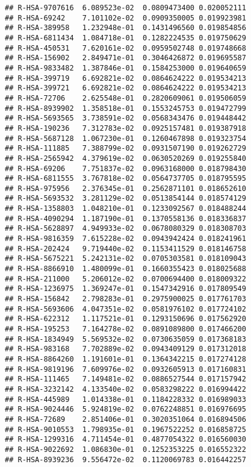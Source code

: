 \documentclass[
]{article}
\begin{document}
\begin{verbatim}
## R-HSA-9707616  6.089523e-02  0.0809473400 0.020052111
## R-HSA-69242    7.101102e-02  0.0909350005 0.019923981
## R-HSA-389958   1.232948e-01  0.1431496560 0.019854856
## R-HSA-6811434  1.084718e-01  0.1282224535 0.019750629
## R-HSA-450531   7.620161e-02  0.0959502748 0.019748668
## R-HSA-156902   2.849471e-01  0.3046426872 0.019695587
## R-HSA-9833482  1.387846e-01  0.1584253000 0.019640659
## R-HSA-399719   6.692821e-02  0.0864624222 0.019534213
## R-HSA-399721   6.692821e-02  0.0864624222 0.019534213
## R-HSA-72706    2.625548e-01  0.2820609061 0.019506059
## R-HSA-8939902  1.358518e-01  0.1553245753 0.019472799
## R-HSA-5693565  3.738591e-02  0.0568343476 0.019448442
## R-HSA-190236   7.312783e-02  0.0925157481 0.019387918
## R-HSA-5687128  1.067230e-01  0.1260467898 0.019323754
## R-HSA-111885   7.388799e-02  0.0931507190 0.019262729
## R-HSA-2565942  4.379619e-02  0.0630520269 0.019255840
## R-HSA-69206    7.751837e-02  0.0963168000 0.018798430
## R-HSA-6811555  3.767818e-02  0.0564737705 0.018795595
## R-HSA-975956   2.376345e-01  0.2562871101 0.018652610
## R-HSA-5693532  3.281129e-02  0.0513854144 0.018574129
## R-HSA-1358803  1.048210e-01  0.1233092567 0.018488244
## R-HSA-4090294  1.187190e-01  0.1370558136 0.018336837
## R-HSA-5628897  4.949933e-02  0.0678080329 0.018308703
## R-HSA-9816359  7.615228e-02  0.0943942424 0.018241961
## R-HSA-202424   9.719440e-02  0.1153411529 0.018146758
## R-HSA-5675221  5.242131e-02  0.0705303581 0.018109043
## R-HSA-8866910  1.480099e-01  0.1660355423 0.018025688
## R-HSA-211000   5.206012e-02  0.0700694400 0.018009322
## R-HSA-1236975  1.369247e-01  0.1547342916 0.017809549
## R-HSA-156842   2.798283e-01  0.2975900025 0.017761703
## R-HSA-5693606  4.047351e-02  0.0581976102 0.017724102
## R-HSA-622312   1.117521e-01  0.1293150696 0.017562920
## R-HSA-195253   7.164278e-02  0.0891089800 0.017466200
## R-HSA-1834949  5.569532e-02  0.0730635059 0.017368183
## R-HSA-983168   7.702889e-02  0.0943409129 0.017312018
## R-HSA-8864260  1.191601e-01  0.1364342215 0.017274128
## R-HSA-9819196  7.609976e-02  0.0932605913 0.017160831
## R-HSA-111465   7.149481e-02  0.0886527544 0.017157942
## R-HSA-3232142  4.133540e-02  0.0583298222 0.016994422
## R-HSA-445989   1.014338e-01  0.1184228332 0.016989033
## R-HSA-9024446  5.924819e-02  0.0762248851 0.016976695
## R-HSA-72689    2.851406e-01  0.3020351064 0.016894506
## R-HSA-9010553  1.798935e-01  0.1967522252 0.016858725
## R-HSA-1299316  4.711454e-01  0.4877054322 0.016560030
## R-HSA-9022692  1.086830e-01  0.1252353225 0.016552322
## R-HSA-8939236  9.556472e-02  0.1120069783 0.016442257

\end{verbatim}
\end{document}
